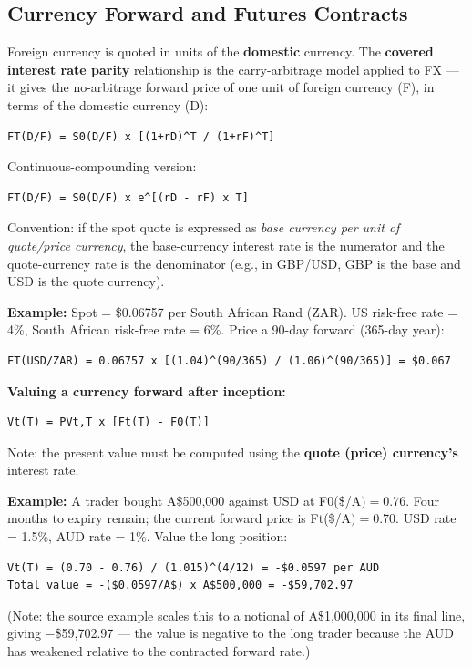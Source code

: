 \documentclass[12pt,openany]{book}
\theoremstyle{definition}
\theoremstyle{remark}
\begin{document}
\subsection{Currency Forward and Futures Contracts}

Foreign currency is quoted in units of the \textbf{domestic} currency. The \textbf{covered interest rate parity} relationship is the carry-arbitrage model applied to FX — it gives the no-arbitrage forward price of one unit of foreign currency (F), in terms of the domestic currency (D):
\begin{lstlisting}[style=notesCode]
FT(D/F) = S0(D/F) x [(1+rD)^T / (1+rF)^T]
\end{lstlisting}
Continuous-compounding version:
\begin{lstlisting}[style=notesCode]
FT(D/F) = S0(D/F) x e^[(rD - rF) x T]
\end{lstlisting}
Convention: if the spot quote is expressed as \emph{base currency per unit of quote/price currency}, the base-currency interest rate is the numerator and the quote-currency rate is the denominator (e.g., in GBP/USD, GBP is the base and USD is the quote currency).

\textbf{Example:} Spot = \$0.06757 per South African Rand (ZAR). US risk-free rate = 4\%, South African risk-free rate = 6\%. Price a 90-day forward (365-day year):
\begin{lstlisting}[style=notesCode]
FT(USD/ZAR) = 0.06757 x [(1.04)^(90/365) / (1.06)^(90/365)] = $0.067
\end{lstlisting}

\textbf{Valuing a currency forward after inception:}
\begin{lstlisting}[style=notesCode]
Vt(T) = PVt,T x [Ft(T) - F0(T)]
\end{lstlisting}
Note: the present value must be computed using the \textbf{quote (price) currency's} interest rate.

\textbf{Example:} A trader bought A\$500,000 against USD at F0(\$/A\() = \)0.76. Four months to expiry remain; the current forward price is Ft(\$/A\() = \)0.70. USD rate = 1.5\%, AUD rate = 1\%. Value the long position:
\begin{lstlisting}[style=notesCode]
Vt(T) = (0.70 - 0.76) / (1.015)^(4/12) = -$0.0597 per AUD
Total value = -($0.0597/A$) x A$500,000 = -$59,702.97
\end{lstlisting}
(Note: the source example scales this to a notional of A\$1,000,000 in its final line, giving −\$59,702.97 — the value is negative to the long trader because the AUD has weakened relative to the contracted forward rate.)
\end{document}
